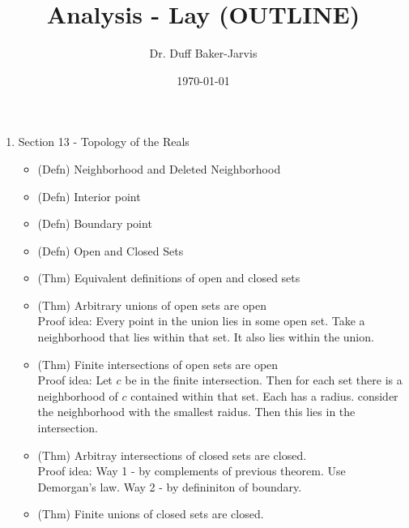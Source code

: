\documentclass[12pt]{article}
\theoremstyle{definition}
\begin{document}
\title{Analysis - Lay (OUTLINE)}
\date{\today}
\author{Dr. Duff Baker-Jarvis}
\maketitle


\begin{enumerate}
    \item Section 13 - Topology of the Reals
	\begin{itemize}
	    \item (Defn) Neighborhood and Deleted Neighborhood
	    \item (Defn) Interior point
	    \item (Defn) Boundary point
	    \item (Defn) Open and Closed Sets
	    \item (Thm) Equivalent definitions of open and closed sets
	    \item (Thm) Arbitrary unions of open sets are open\\
		    Proof idea: Every point in the union lies in some open set. Take a neighborhood that lies within that set. It also lies within the union.
	    \item (Thm) Finite intersections of open sets are open\\
		Proof idea: Let $ c $ be in the finite intersection. Then for each set there is a neighborhood of $ c $ contained within that set. Each has a radius. 
		consider the neighborhood with the smallest raidus. Then  this lies in the intersection.
	    \item (Thm) Arbitray intersections of closed sets are closed.\\
		Proof idea: Way 1 - by complements of previous theorem. Use Demorgan's law. Way 2 - by defininiton of boundary.
	    \item (Thm) Finite unions of closed sets are closed.
	\end{itemize}
	
\end{enumerate}
\end{document}
